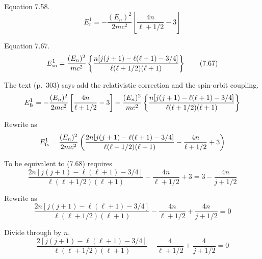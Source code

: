 


Equation 7.58.
\begin{equation*}
E_r^1=-\frac{(E_n)^2}{2mc^2}
\left[\frac{4n}{\ell+1/2}-3\right]
\tag{7.58}
\end{equation*}

Equation 7.67.
\begin{equation*}
E_{\rm so}^1=\frac{(E_n)^2}{mc^2}
\left\{\frac{n[j(j+1)-\ell(\ell+1)-3/4]}{\ell(\ell+1/2)(\ell+1)}\right\}
\tag{7.67}
\end{equation*}

The text (p.~303) says add the relativistic correction and the spin-orbit coupling.
\begin{equation*}
E_{\rm fs}^1=-\frac{(E_n)^2}{2mc^2}
\left[\frac{4n}{\ell+1/2}-3\right]
+\frac{(E_n)^2}{mc^2}
\left\{\frac{n[j(j+1)-\ell(\ell+1)-3/4]}{\ell(\ell+1/2)(\ell+1)}\right\}
\end{equation*}

Rewrite as
\begin{equation*}
E_{\rm fs}^1=\frac{(E_n)^2}{2mc^2}
\left(
\frac{2n[j(j+1)-\ell(\ell+1)-3/4]}{\ell(\ell+1/2)(\ell+1)}-\frac{4n}{\ell+1/2}+3
\right)
\end{equation*}

To be equivalent to (7.68) requires
\begin{equation*}
\frac{2n[j(j+1)-\ell(\ell+1)-3/4]}{\ell(\ell+1/2)(\ell+1)}-\frac{4n}{\ell+1/2}+3=
3-\frac{4n}{j+1/2}
\end{equation*}

Rewrite as
\begin{equation*}
\frac{2n[j(j+1)-\ell(\ell+1)-3/4]}{\ell(\ell+1/2)(\ell+1)}-\frac{4n}{\ell+1/2}+\frac{4n}{j+1/2}=0
\end{equation*}

Divide through by $n$.
\begin{equation*}
\frac{2[j(j+1)-\ell(\ell+1)-3/4]}{\ell(\ell+1/2)(\ell+1)}-\frac{4}{\ell+1/2}+\frac{4}{j+1/2}=0
\end{equation*}




